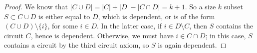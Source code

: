 \documentclass[10pt,a4paper]{amsart}
\begin{document}
\begin{proof} 
We know that $|C \cup D| = |C| + |D| - |C \cap D| = k+1.$ 
So a size $k$ subset $S \subset C \cup D$ is either equal to $D$, which is dependent, or is of the form $(C \cup D) \setminus \{i\}$, for some $i \in D$. In the latter case, if $i \in D\setminus C$, then $S$ contains the circuit $C$, hence is dependent. Otherwise, we must have $i \in C \cap D$; in this case, $S$ contains a circuit by the third circuit axiom, so $S$ is again dependent. 
\end{proof}
\end{document}
